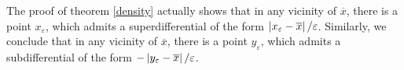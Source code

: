 	\begin{remark}
		\label{special_differentials}
		The proof of theorem \ref{density} actually shows that in any vicinity of $ \overline{x} $, there is a point $ x_{\varepsilon} $, which admits a superdifferential of the form $ \left\lvert {x_{\varepsilon} - \overline{x}} \right\rvert / \varepsilon $. Similarly, we conclude that in any vicinity of $ \overline{x} $, there is a point $ y_{\varepsilon} $, which admits a subdifferential of the form $ - \left\lvert {y_{\varepsilon} - \overline{x}} \right\rvert / \varepsilon $.
	\end{remark}
	
		